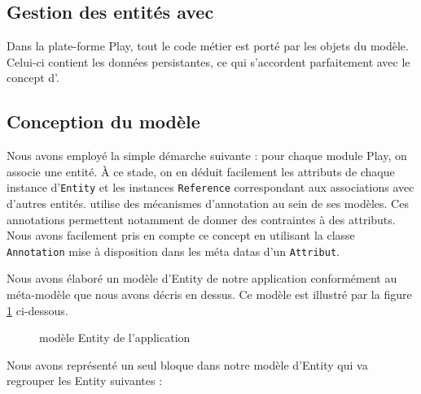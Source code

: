 \subsection{Gestion des entités avec \kwplay{}}

Dans la plate-forme Play, tout le code métier est porté par les objets du modèle. Celui-ci contient les données persistantes, ce qui s'accordent parfaitement avec le concept d'\kwentity.  
         

\subsection{Conception du modèle}
Nous avons employé la simple démarche suivante : pour chaque module Play, on associe une entité. À ce stade, on en déduit facilement les attributs de chaque instance d'\verb+Entity+ et les instances \verb+Reference+ correspondant aux associations avec d'autres entités. \kwplay{} utilise des mécanismes d'annotation au sein de ses modèles. Ces annotations permettent notamment de donner des contraintes à des attributs. Nous avons facilement pris en compte ce concept en utilisant la classe \verb+Annotation+ mise à disposition dans les méta datas d'un \verb+Attribut+.

Nous avons élaboré un modèle d'Entity de notre application conformément au méta-modèle que nous avons décris en dessus. Ce modèle est illustré par la figure \ref{fig:entMod} ci-dessous.

\begin{figure}[H]
  \centering
  \caption{modèle Entity de l'application}
  \label{fig:entMod}
\end{figure}

Nous avons représenté un seul bloque dans notre modèle d'Entity qui va regrouper les Entity suivantes :  

